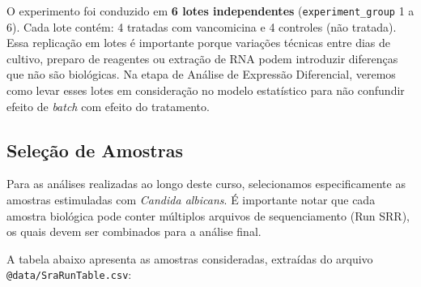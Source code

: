 \documentclass[
  letterpaper,
  DIV=11,
  numbers=noendperiod]{scrreprt}
\begin{document}
O experimento foi conduzido em \textbf{6 lotes independentes}
(\texttt{experiment\_group} 1 a 6). Cada lote contém: 4 tratadas com
vancomicina e 4 controles (não tratada). Essa replicação em lotes é
importante porque variações técnicas entre dias de cultivo, preparo de
reagentes ou extração de RNA podem introduzir diferenças que não são
biológicas. Na etapa de Análise de Expressão Diferencial, veremos como
levar esses lotes em consideração no modelo estatístico para não
confundir efeito de \emph{batch} com efeito do tratamento.

\subsection{Seleção de Amostras}\label{seleuxe7uxe3o-de-amostras}

Para as análises realizadas ao longo deste curso, selecionamos
especificamente as amostras estimuladas com \emph{Candida albicans}. É
importante notar que cada amostra biológica pode conter múltiplos
arquivos de sequenciamento (Run SRR), os quais devem ser combinados para
a análise final.

A tabela abaixo apresenta as amostras consideradas, extraídas do arquivo
\texttt{@data/SraRunTable.csv}:
\end{document}
